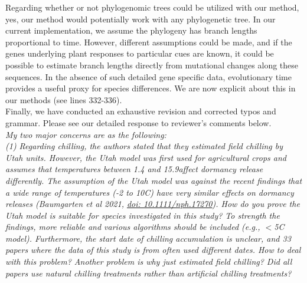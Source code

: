 \documentclass[11pt]{article}
\begin{document}
Regarding whether or not phylogenomic trees could be utilized with our method, yes, our method would potentially work with any phylogenetic tree. In our current implementation, we assume the phylogeny has branch lengths proportional to time. However, different assumptions could be made, and if the genes underlying plant responses to particular cues are known, it could be possible to estimate branch lengths directly from mutational changes along these sequences. In the absence of such detailed gene specific data, evolutionary time provides a useful proxy for species differences. We are now explicit about this in our methods (see lines 332-336). \\

Finally, we have conducted an exhaustive revision and corrected typos and grammar. Please see our detailed response to reviewer's comments below. \\

\emph{My two major concerns are as the following:}\\ %
\emph{(1) Regarding chilling, the authors stated that they estimated field chilling by Utah units. However, the Utah model was first used for agricultural crops and assumes that temperatures between 1.4 and 15.9\degreeC affect dormancy release differently. The assumption of the Utah model was against the recent findings that a wide range of temperatures (-2 to 10\degree C) have very similar effects on dormancy releases (Baumgarten et al 2021, \url{doi: 10.1111/nph.17270}). How do you prove the Utah model is suitable for species investigated in this study? To strength the findings, more reliable and various algorithms should be included (e.g., $<$5\degree C model). Furthermore, the start date of chilling accumulation is unclear, and 33 papers where the data of this study is from often used different dates. How to deal with this problem? Another problem is why just estimated field chilling? Did all papers use natural chilling treatments rather than artificial chilling treatments?}\\
\end{document}
